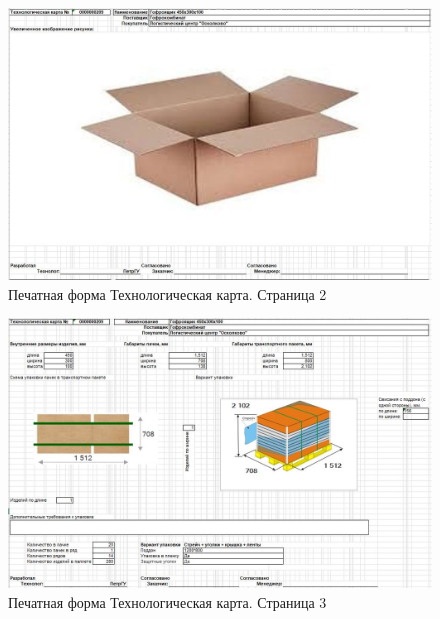 \begin{figure}
\begin{center}
  \includegraphics[height=0.7\textheight, width=\textwidth, angle=90,
  keepaspectratio]{50_Pics/Tk_2.JPG}
\end{center}
  \caption{Печатная форма Технологическая карта. Страница 2}
  \label{pic:Tk_2}
\end{figure}

\begin{figure}
\begin{center}
  \includegraphics[height=0.7\textheight, width=\textwidth, angle=90,
  keepaspectratio]{50_Pics/Tk_3.JPG}
\end{center}
  \caption{Печатная форма Технологическая карта. Страница 3}
  \label{pic:Tk_3}
\end{figure}

